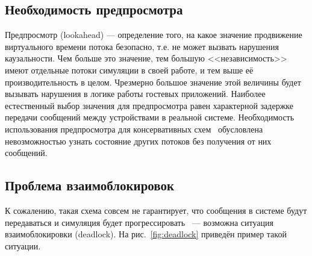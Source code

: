 \subsection{Необходимость предпросмотра}

Предпросмотр (\abbr lookahead) --- определение того, на какое значение продвижение виртуального времени потока безопасно, т.е. не может вызвать нарушения каузальности. Чем больше это значение, тем большую <<независимость>> имеют отдельные потоки симуляции в своей работе, и тем выше её производительность в целом. Чрезмерно большое значение этой величины будет вызывать нарушения в логике  работы гостевых приложений. Наиболее естественный выбор значения для предпросмотра равен характерной задержке передачи сообщений между устройствами в реальной системе. Необходимость использования предпросмотра для консервативных схем~\cite{ferscha-1995-pdes} обусловлена невозможностью узнать состояние других потоков без получения от них сообщений.

\subsection{Проблема взаимоблокировок}

К сожалению, такая схема совсем не гарантирует, что сообщения в системе будут передаваться и симуляция будет прогрессировать~\cite{Misra86distributeddiscrete-event} --- возможна ситуация взаимоблокировки (\abbr deadlock). На рис.~\ref{fig:deadlock} приведён пример такой ситуации.

